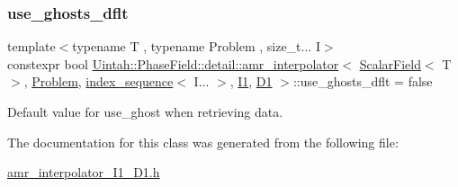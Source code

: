 \subsubsection{\texorpdfstring{use\+\_\+ghosts\+\_\+dflt}{use\_ghosts\_dflt}}
{\footnotesize\ttfamily template$<$typename T , typename Problem , size\+\_\+t... I$>$ \\
constexpr bool \hyperlink{classUintah_1_1PhaseField_1_1detail_1_1amr__interpolator}{Uintah\+::\+Phase\+Field\+::detail\+::amr\+\_\+interpolator}$<$ \hyperlink{structUintah_1_1PhaseField_1_1ScalarField}{Scalar\+Field}$<$ T $>$, \hyperlink{classUintah_1_1PhaseField_1_1Problem}{Problem}, \hyperlink{namespaceUintah_1_1PhaseField_a237de804d99512e50613aff7c94a9461}{index\+\_\+sequence}$<$ I... $>$, \hyperlink{namespaceUintah_1_1PhaseField_a547ce3002aa97fbd3ef3192a6eec8406a66f19efe774b0d2b6e5844eb2d83d305}{I1}, \hyperlink{namespaceUintah_1_1PhaseField_a12bfc68444894dffdf0cb8d9cf0cc76aa24dcc0ba6bcb45bc6f503b1b538c6809}{D1} $>$\+::use\+\_\+ghosts\+\_\+dflt = false\hspace{0.3cm}{\ttfamily [static]}}



Default value for use\+\_\+ghost when retrieving data. 



The documentation for this class was generated from the following file\+:\begin{DoxyCompactItemize}
\item 
\hyperlink{amr__interpolator__I1__D1_8h}{amr\+\_\+interpolator\+\_\+\+I1\+\_\+\+D1.\+h}\end{DoxyCompactItemize}
